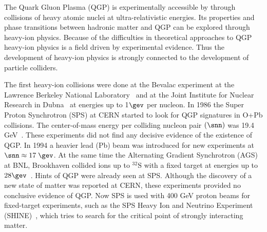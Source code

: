 The Quark Gluon Plasma (QGP) is experimentally accessible by through collisions of heavy atomic nuclei at ultra-relativistic energies. Its properties and phase transitions between hadronic matter and QGP can be explored through heavy-ion physics. Because of the difficulties in theoretical approaches to QGP heavy-ion physics is a field driven by experimental evidence. Thus the development of heavy-ion physics is strongly connected to the development of particle colliders. 


The first heavy-ion collisions were done at the Bevalac experiment at the Lawrence Berkeley National Laboratory~\cite{Lofgren_1975} and at the Joint Institute for Nuclear Research in Dubna~\cite{kovalenko1994status} at energies up to 1$\gev$ per nucleon.
In 1986 the Super Proton Synchrotron (SPS) at CERN started to look for QGP signatures in O+Pb collisions. The center-of-mass energy per colliding nucleon pair $\left(\snn\right)$ was 19.4 GeV~\cite{Vitev:2002pf}. These experiments did not find any decisive evidence of the existence of QGP. In 1994 a heavier lead (Pb) beam was introduced for new experiments at $\snn\approx 17\; \gev$. At the same time the Alternating Gradient Synchrotron (AGS) at BNL, Brookhaven collided ions up to $\mathrm{^{32}S}$ with a fixed target at energies up to $28\gev$~\cite{Barton:1987}. Hints of QGP were already seen at SPS. Although the discovery of a new state of matter was reported at CERN, these experiments provided no conclusive evidence of QGP. Now SPS is used with 400 GeV proton beams for fixed-target experiments, such as the SPS Heavy Ion and Neutrino Experiment (SHINE)~\cite{Grebieszkow:2013nza}, which tries to search for the critical point of strongly interacting matter.

